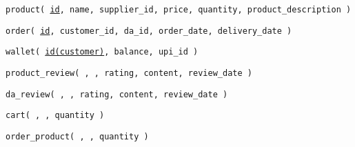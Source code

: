 \begin{entity}
    \hspace*{-15pt}\texttt{product( \underline{id}, name, supplier\_id, price, quantity, product\_description )}
\end{entity}

\begin{entity}
    \hspace*{-15pt}\texttt{order( \underline{id}, customer\_id, da\_id, order\_date, delivery\_date )}
\end{entity}

\begin{entity}
    \hspace*{-15pt}\texttt{wallet( \underline{id(customer)}, balance, upi\_id )}
\end{entity}

\begin{relationship}
    \hspace*{-15pt}\texttt{product\_review( , , rating, content, review\_date )}
\end{relationship}

\begin{relationship}
    \hspace*{-15pt}\texttt{da\_review( , , rating, content, review\_date )}
\end{relationship}

\begin{relationship}
    \hspace*{-15pt}\texttt{cart( , , quantity )}
\end{relationship}

\begin{relationship}
    \hspace*{-15pt}\texttt{order\_product( , , quantity )}
\end{relationship}